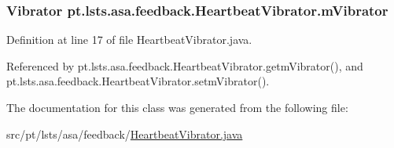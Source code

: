 \subsubsection[{m\+Vibrator}]{\setlength{\rightskip}{0pt plus 5cm}Vibrator pt.\+lsts.\+asa.\+feedback.\+Heartbeat\+Vibrator.\+m\+Vibrator\hspace{0.3cm}{\ttfamily [private]}}\label{classpt_1_1lsts_1_1asa_1_1feedback_1_1HeartbeatVibrator_a4482c3c6c9095b1103daa19bbc3a0fcd}


Definition at line 17 of file Heartbeat\+Vibrator.\+java.



Referenced by pt.\+lsts.\+asa.\+feedback.\+Heartbeat\+Vibrator.\+getm\+Vibrator(), and pt.\+lsts.\+asa.\+feedback.\+Heartbeat\+Vibrator.\+setm\+Vibrator().



The documentation for this class was generated from the following file\+:\begin{DoxyCompactItemize}
\item 
src/pt/lsts/asa/feedback/\hyperlink{HeartbeatVibrator_8java}{Heartbeat\+Vibrator.\+java}\end{DoxyCompactItemize}
